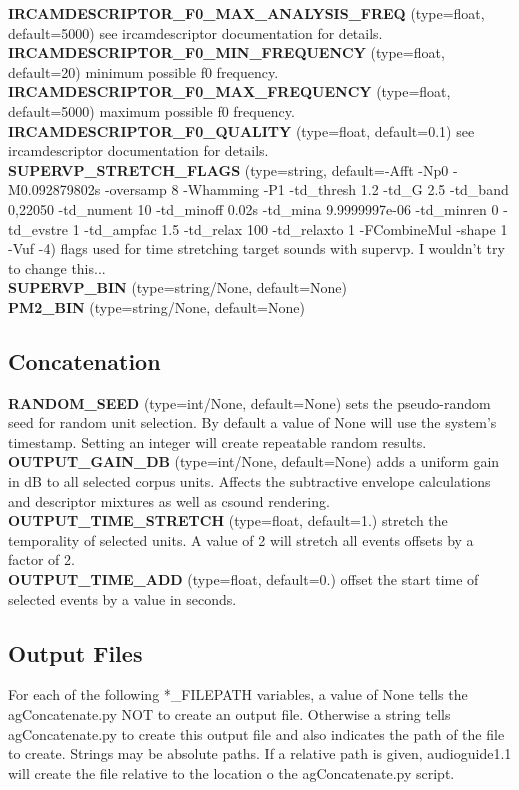\documentclass{article}
\newcommand{\optEntry}[4]{\textbf{#1} (type=#2, default=#3) #4\hspace{0.5em}\\}
\newcommand{\ag}{audioguide1.1 }
\begin{document}
\begin{spacing}{1.2}
\optEntry{IRCAMDESCRIPTOR\_F0\_MAX\_ANALYSIS\_FREQ}{float}{5000}{see ircamdescriptor documentation for details.}

\optEntry{IRCAMDESCRIPTOR\_F0\_MIN\_FREQUENCY}{float}{20}{minimum possible f0 frequency.}

\optEntry{IRCAMDESCRIPTOR\_F0\_MAX\_FREQUENCY}{float}{5000}{maximum possible f0 frequency.}

\optEntry{IRCAMDESCRIPTOR\_F0\_QUALITY}{float}{0.1}{see ircamdescriptor documentation for details.}

\optEntry{SUPERVP\_STRETCH\_FLAGS}{string}{-Afft -Np0 -M0.092879802s -oversamp 8 -Whamming -P1 -td\_thresh 1.2 -td\_G 2.5 -td\_band 0,22050 -td\_nument 10 -td\_minoff 0.02s -td\_mina 9.9999997e-06 -td\_minren 0 -td\_evstre 1 -td\_ampfac 1.5 -td\_relax 100 -td\_relaxto 1 -FCombineMul -shape 1 -Vuf -4}{flags used for time stretching target sounds with supervp.  I wouldn't try to change this...}

\optEntry{SUPERVP\_BIN}{string/None}{None}{}

\optEntry{PM2\_BIN}{string/None}{None}{}


\subsection{Concatenation}
\optEntry{RANDOM\_SEED}{int/None}{None}{sets the pseudo-random seed for random unit selection.  By default a value of None will use the system's timestamp.  Setting an integer will create repeatable random results.}

\optEntry{OUTPUT\_GAIN\_DB}{int/None}{None}{adds a uniform gain in dB to all selected corpus units.  Affects the subtractive envelope calculations and descriptor mixtures as well as csound rendering.}

\optEntry{OUTPUT\_TIME\_STRETCH}{float}{1.}{stretch the temporality of selected units.  A value of 2 will stretch all events offsets by a factor of 2.}

\optEntry{OUTPUT\_TIME\_ADD}{float}{0.}{offset the start time of selected events by a value in seconds.}

\subsection{Output Files}\label{outputfiles}
For each of the following *\_FILEPATH variables, a value of None tells the agConcatenate.py NOT to create an output file.  Otherwise a string tells agConcatenate.py to create this output file and also indicates the path of the file to create.  Strings may be absolute paths.  If a relative path is given, \ag will create the file relative to the location o the agConcatenate.py script.


\end{spacing}
\end{document}
